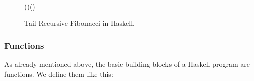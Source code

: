 \documentclass[paper=A4,twoside=true,openright,parskip=full,chapterprefix=true,headings=normal,bibliography=totoc,listof=totoc,titlepage=on,captions=tableabove,draft=false,british]{scrreprt}%
\begin{document}
\begin{figure}[ht]
\centering
\begin{hscode}\SaveRestoreHook
{}%
%
%
%
%
\>[B]{}\mathbin{::}\to {}\<[E]%
\\
\>[B]{}\;\<[E]%
\\
\>[B]{}\<[5]%
\>[5]{}\mid {}\leq {}\mathrel{=}\<[E]%
\\
\>[B]{}\<[5]%
\>[5]{}\mid {}\mathrel{=}\;\;\;\<[E]%
\\
\>[B]{}\<[5]%
\>[5]{}\<[E]%
\\
\>[5]{}\<[9]%
\>[9]{}\mathbin{::}\to {}\to {}\to {}\<[E]%
\\
\>[5]{}\<[9]%
\>[9]{}\;\;\;\<[E]%
\\
\>[9]{}\<[13]%
\>[13]{}\mid {}\equiv {}\mathrel{=}\<[E]%
\\
\>[9]{}\<[13]%
\>[13]{}\mid {}\mathrel{=}\;(\mathbin{-})\;\;(\mathbin{+}){}\<[E]%
\ColumnHook
\end{hscode}\resethooks
\caption{Tail Recursive Fibonacci in Haskell.}\label{fig:fibonacciHaskellTailRecursive}\end{figure}

\hypertarget{functions}{%
\subsubsection{Functions}\label{functions}}

As already mentioned above, the basic building blocks of a Haskell
program are functions. We define them like this:


\begin{hscode}\SaveRestoreHook
{}%
%
\>[B]{}\mathbin{::}\to {}\to {}\<[E]%
\\
\>[B]{}\;\;\mathrel{=}\;\;\<[E]%
\ColumnHook
\end{hscode}\resethooks
\vspace{-2\baselineskip}
\end{document}
